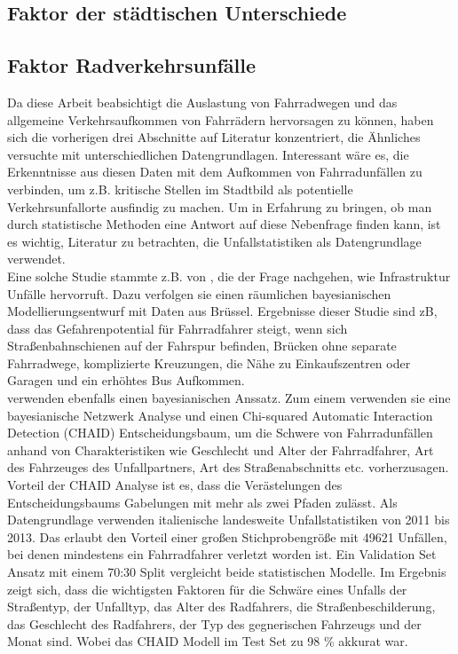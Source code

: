 \documentclass[a4paper,12pt]{thesis}
\begin{document}
\subsection{Faktor der städtischen Unterschiede}

\subsection{Faktor Radverkehrsunfälle}

Da diese Arbeit beabsichtigt die Auslastung von Fahrradwegen und das allgemeine Verkehrsaufkommen von Fahrrädern hervorsagen zu können, haben sich die vorherigen drei Abschnitte auf Literatur konzentriert, die Ähnliches versuchte mit unterschiedlichen Datengrundlagen. Interessant wäre es, die Erkenntnisse aus diesen Daten mit dem Aufkommen von Fahrradunfällen zu verbinden, um z.B. kritische Stellen im Stadtbild als potentielle Verkehrsunfallorte ausfindig zu machen. Um in Erfahrung zu bringen, ob man durch statistische Methoden eine Antwort auf diese Nebenfrage finden kann, ist es wichtig, Literatur zu betrachten, die Unfallstatistiken als Datengrundlage verwendet.\\
Eine solche Studie stammte z.B. von \cite{Vandenbulcke2014}, die der Frage nachgehen, wie Infrastruktur Unfälle hervorruft. Dazu verfolgen sie einen räumlichen bayesianischen Modellierungsentwurf mit Daten aus Brüssel. Ergebnisse dieser Studie sind zB, dass das Gefahrenpotential für Fahrradfahrer steigt, wenn sich Straßenbahnschienen auf der Fahrspur befinden, Brücken ohne separate Fahrradwege, komplizierte Kreuzungen, die Nähe zu Einkaufszentren oder Garagen und ein erhöhtes Bus Aufkommen.\\
\cite{PRATI201744} verwenden ebenfalls einen bayesianischen Anssatz. Zum einem verwenden sie eine bayesianische Netzwerk Analyse und einen Chi-squared Automatic Interaction Detection (CHAID) Entscheidungsbaum, um die Schwere von Fahrradunfällen anhand von Charakteristiken wie Geschlecht und Alter der Fahrradfahrer, Art des Fahrzeuges des Unfallpartners, Art des Straßenabschnitts etc. vorherzusagen. Vorteil der CHAID Analyse ist es, dass die Verästelungen des Entscheidungsbaums Gabelungen mit mehr als zwei Pfaden zulässt. Als Datengrundlage verwenden \cite{PRATI201744} italienische landesweite Unfallstatistiken von 2011 bis 2013. Das erlaubt den Vorteil einer großen Stichprobengröße mit 49621 Unfällen, bei denen mindestens ein Fahrradfahrer verletzt worden ist. Ein Validation Set Ansatz mit einem 70:30 Split vergleicht beide statistischen Modelle. Im Ergebnis zeigt sich, dass die wichtigsten Faktoren für die Schwäre eines Unfalls der Straßentyp, der Unfalltyp, das Alter des Radfahrers, die Straßenbeschilderung, das Geschlecht des Radfahrers, der Typ des gegnerischen Fahrzeugs und der Monat sind. Wobei das CHAID Modell im Test Set zu 98 \% akkurat war.\\
\end{document}
